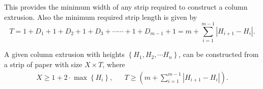 This provides the minimum width of any strip required to construct a column extrusion.
Also the minimum required strip length is given by
$$ T = 1 + D_1  +  1 + D_2  +  1 + D_3  +\cdots\cdots +  1 + D_{m-1}  +  1 = m + \sum^{m-1}_{i=1} \left| H_{i+1}-H_i\right|. $$

\begin{theorem}
\label{thm:column_extrusion}
A given column extrusion with heights $\left\{ H_1, H_2,\cdots H_n \right\}$, can be constructed from a strip of paper with size
$X\times T$, where
\begin{align*}
X\ge 1 + 2\cdot\max\left\{ H_i\right\}, && T \ge \left( m + \sum\limits^{m-1}_{i=1} \left| H_{i+1}-H_i\right|\right).
\end{align*}
\end{theorem}



